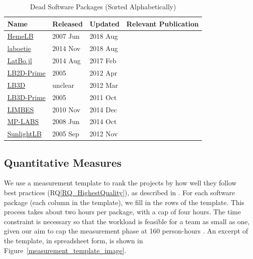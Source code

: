 \documentclass[final, 3p, times, authoryear]{elsarticle}
\newcommand{\rqref}[1]{RQ\ref{#1}}
\begin{document}
\begin{table}[ht!]
	\begin{center}
		\begin{tabular}{ p{3cm}p{2cm}p{2cm}p{5.5cm} }
			\toprule
			Name & Released & Updated & Relevant Publication\\
			\midrule
			\href{https://github.com/UCL/hemelb}{HemeLB} & 2007 Jun & 2018 Aug&\citep{mazzeo2008hemelb}\\
			\href{https://github.com/maxlevesque/laboetie}{laboetie} & 2014 Nov & 2018 Aug&\citep{levesque2013accounting}\\		
			\href{https://github.com/UCL/LatBo.jl}{LatBo.jl} & 2014 Aug & 2017 Feb&\\
			\href{https://code.google.com/p/lb2d-prime-dev/source}{LB2D-Prime} & 2005 & 2012 Apr&\\
			\href{http://ccs.chem.ucl.ac.uk/sites/ccs.chem.ucl.ac.uk/themes/ccs2/files/lb3d-2012-03-12.tgz}{LB3D} & unclear & 2012 Mar&\citep{schmieschek2017lb3d}\\
			\href{https://code.google.com/archive/p/lb3d-prime-dev/source}{LB3D-Prime} & 2005 & 2011 Oct&\\
			\href{https://code.google.com/archive/p/limbes/source}{LIMBES} & 2010 Nov & 2014 Dec&\\
			\href{https://github.com/carlosrosales/mplabs}{MP-LABS} & 2008 Jun & 2014 Oct&\\
			\href{https://sourceforge.net/projects/sunlightlb/files/latest/download}{SunlightLB} & 2005 Sep & 2012 Nov&\\
			\bottomrule
		\end{tabular}
		\caption{Dead Software Packages (Sorted Alphabetically)} \label{deadpackages}
	\end{center}
\end{table}

\subsection{Quantitative Measures} \label{empiricalmeasures}

We use a measurement template to rank the projects by how well they follow best
practices (\rqref{RQ_HighestQuality}), as described in \citet{SmithEtAl2021}.
For each software package (each column in the template), we fill in the rows of
the template. This process takes about two hours per package, with a cap of four
hours. The time constraint is necessary so that the workload is feasible for a
team as small as one, given our aim to cap the measurement phase at 160
person-hours \citep{SmithEtAl2021}.  An excerpt of the template, in spreadsheet
form, is shown in Figure~\ref{measurement_template_image}.
\end{document}
